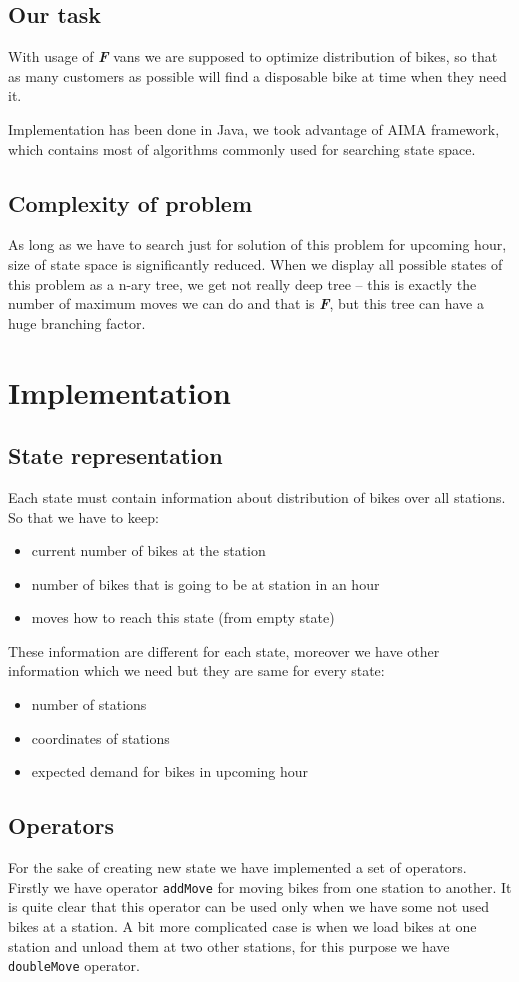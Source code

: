 \documentclass[11pt,twoside,a4paper]{mr}%
\begin{document}
\section{Our task}
With usage of \textbf{\textsl{F}} vans we are supposed to optimize distribution of bikes, so that as many customers as possible will find a disposable bike at time when they need it.

Implementation has been done in Java, we took advantage of AIMA framework\cite{aima}, which contains most of algorithms commonly used for  searching state space.

\section{Complexity of problem}
As long as we have to search just for solution of this problem for upcoming hour, size of state space is significantly reduced. When we display all possible states of this problem as a n-ary tree, we get not really deep tree -- this is exactly the number of maximum moves we can do and that is \textbf{\textsl{F}}, but this tree can have a huge branching factor. 


\chapter{Implementation}
\section{State representation} 
Each state must contain information about distribution of bikes over all stations. So that we have to keep:
\begin{itemize}
\item current number of bikes at the station
\item number of bikes that is going to be at station in an hour 
\item moves how to reach this state (from empty state)
\end{itemize}
These information are different for each state, moreover we have other information which we need but they are same for every state:
\begin{itemize}
 \item number of stations
 \item coordinates of stations
 \item expected demand for bikes in upcoming hour
\end{itemize}


\section{Operators}
For the sake of creating new state we have implemented a set of operators. Firstly we have operator \texttt{addMove} for moving bikes from one station to another. It is quite clear that this operator can be used only when we have some not used bikes at a station. A bit more complicated case is when we load bikes at one station and unload them at two other stations, for this purpose we have \texttt{doubleMove} operator.
\end{document}
